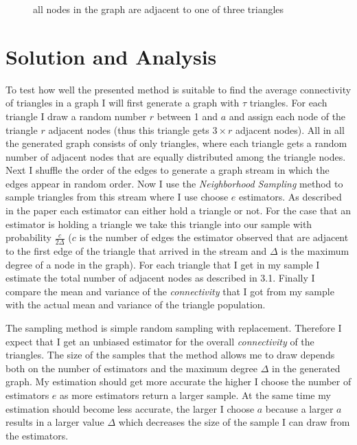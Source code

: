 \documentclass[12pt,twoside,a4paper]{report}
\begin{document}
\begin{figure}
\caption{all nodes in the graph are adjacent to one of three triangles}
\end{figure}
\section{Solution and Analysis}
To test how well the presented method is suitable to find the average connectivity of triangles in a graph I will first generate a graph with $\tau$ triangles. For each triangle I draw a random number $r$ between 1 and $a$ and assign each node of the triangle $r$ adjacent nodes (thus this triangle gets $3\times r$ adjacent nodes). All in all the generated graph consists of only triangles, where each triangle gets a random number of adjacent nodes that are equally distributed among the triangle nodes. Next I shuffle the order of the edges to generate a graph stream in which the edges appear in random order. Now I use the \textit{Neighborhood Sampling} method to sample triangles from this stream where I use choose $e$ estimators. As described in the paper each estimator can either hold a triangle or not. For the case that an estimator is holding a triangle we take this triangle into our sample with probability $\frac{c}{2\Delta}$ ($c$ is the number of edges the	 estimator observed that are adjacent to the first edge of the triangle that arrived in the stream and $\Delta$ is the maximum degree of a node in the graph). For each triangle that I get in my sample I estimate the total number of adjacent nodes as described in 3.1. Finally I compare the mean and variance of the \textit{connectivity} that I got from my sample with the actual mean and variance of the triangle population.

The sampling method is simple random sampling with replacement. Therefore I expect that I get an unbiased estimator for the overall \textit{connectivity} of the triangles. The size of the samples that the method allows me to draw depends both on the number of estimators and the maximum degree $\Delta$ in the generated graph. My estimation should get more accurate the higher I choose the number of estimators $e$ as more estimators return a larger sample. At the same time my estimation should become less accurate, the larger I choose $a$ because a larger $a$ results in a larger value $\Delta$ which decreases the size of the sample I can draw from the estimators.
\end{document}
